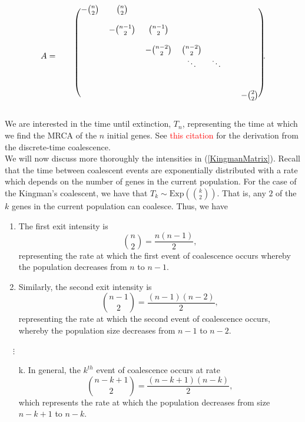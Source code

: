 \documentclass[12pt,a4paper]{article}
\begin{document}
\begin{align}
    A = \quad \begin{blockarray}{cccccccc}
    \begin{block}{c(ccccccc)}
    & -\binom{n}{2} & \binom{n}{2} &  & & & &\\ 
    \\
     &  & -\binom{n-1}{2} & \binom{n-1}{2} &  & & &\\
     \\
     & &  & -\binom{n-2}{2} & \binom{n-2}{2} & & &\\
                    & & & &\ddots & \ddots& & \\
                    & & & & & & & \\
                    & & & & & & & \\
                    & & & & & & & -\binom{2}{2} \\ 
           \end{block}
\end{blockarray}.
\label{KingmanMatrix}
\end{align}

We are interested in the time until extinction, $T_n$, representing the time at which we find the MRCA of the $n$ initial genes. See \textcolor{red}{this citation} for the derivation from the discrete-time coalescence. \\

We will now discuss more thoroughly the intensities in (\ref{KingmanMatrix}). Recall that the time between coalescent events are exponentially distributed with a rate which depends on the number of genes in the current population. For the case of the Kingman's coalescent, we have that $T_k \sim \mbox{Exp}\left(\binom{k}{2}\right)$. That is, any $2$ of the $k$ genes in the current population can coalesce. Thus, we have
\begin{enumerate}%
    \item The first exit intensity is 
    \begin{equation*}
        \binom{n}{2}=\frac{n(n-1)}{2},
    \end{equation*}
    representing the rate at which the first event of coalescence occurs whereby the population decreases from $n$ to $n-1$. 
    \item Similarly, the second exit intensity is
    \begin{equation*}
        \binom{n-1}{2}=\frac{(n-1)(n-2)}{2},
    \end{equation*}
    representing the rate at which the second event of coalescence occurs, whereby the population size decreases from $n-1$ to $n-2$. 
    \end{enumerate}
    $\quad \vdots$
    \begin{enumerate}
    \item[k.] In general, the $k^{th}$ event of coalescence occurs at rate
    \begin{equation*}
        \binom{n-k+1}{2}=\frac{(n-k+1)(n-k)}{2},
    \end{equation*} which represents the rate at which the population decreases from size $n-k+1$ to $n-k$.
    \end{enumerate}
\end{document}
